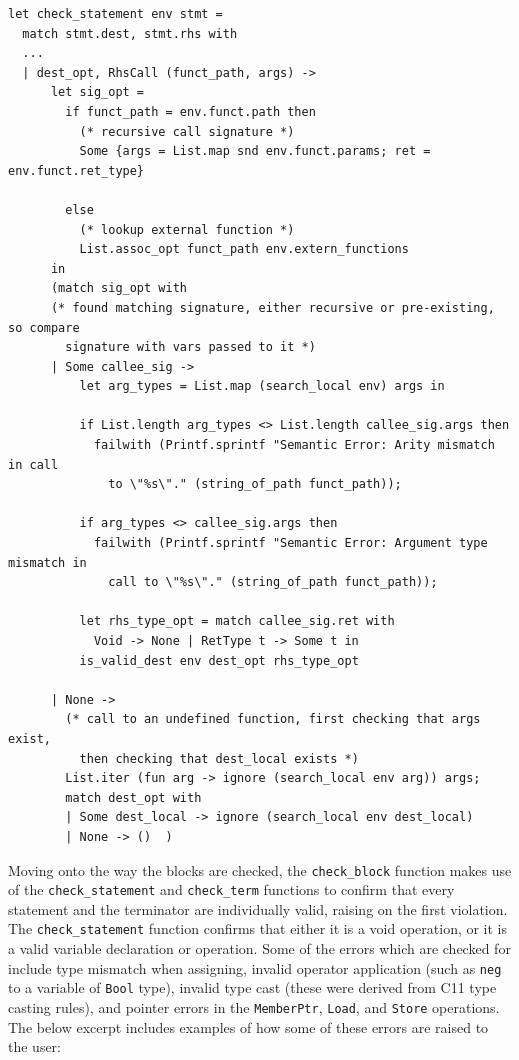 \documentclass[11pt, a4paper]{article}
\begin{document}
\begin{lstlisting}[language={[Objective]Caml}]
let check_statement env stmt =
  match stmt.dest, stmt.rhs with
  ...
  | dest_opt, RhsCall (funct_path, args) ->
      let sig_opt =
        if funct_path = env.funct.path then
          (* recursive call signature *)
          Some {args = List.map snd env.funct.params; ret = env.funct.ret_type}

        else
          (* lookup external function *)
          List.assoc_opt funct_path env.extern_functions
      in
      (match sig_opt with
      (* found matching signature, either recursive or pre-existing, so compare 
        signature with vars passed to it *)
      | Some callee_sig ->
          let arg_types = List.map (search_local env) args in

          if List.length arg_types <> List.length callee_sig.args then
            failwith (Printf.sprintf "Semantic Error: Arity mismatch in call 
              to \"%s\"." (string_of_path funct_path));

          if arg_types <> callee_sig.args then
            failwith (Printf.sprintf "Semantic Error: Argument type mismatch in 
              call to \"%s\"." (string_of_path funct_path));

          let rhs_type_opt = match callee_sig.ret with 
            Void -> None | RetType t -> Some t in
          is_valid_dest env dest_opt rhs_type_opt

      | None ->
        (* call to an undefined function, first checking that args exist, 
          then checking that dest_local exists *)
        List.iter (fun arg -> ignore (search_local env arg)) args;
        match dest_opt with 
        | Some dest_local -> ignore (search_local env dest_local)
        | None -> ()  )
\end{lstlisting}

\medskip

Moving onto the way the blocks are checked, the \texttt{check\_block} function makes use of the \texttt{check\_statement} and \texttt{check\_term} functions to confirm that every statement
and the terminator are individually valid, raising on the first violation.
The \texttt{check\_statement} function confirms that either it is a void operation, or it is a valid variable declaration or operation. Some of the errors which are checked for include 
type mismatch when assigning, invalid operator application (such as \texttt{neg} to a variable of \texttt{Bool} type), invalid type cast (these were derived from C11 type casting rules),
and pointer errors in the \texttt{MemberPtr}, \texttt{Load}, and \texttt{Store} operations. The below excerpt includes examples of how some of these errors are raised to the user:
\end{document}
